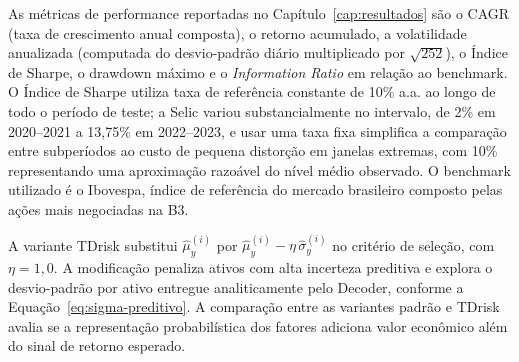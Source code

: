As métricas de performance reportadas no Capítulo~\ref{cap:resultados} são o CAGR
(taxa de crescimento anual composta), o retorno acumulado, a volatilidade anualizada
(computada do desvio-padrão diário multiplicado por $\sqrt{252}$), o Índice de Sharpe,
o drawdown máximo e o \textit{Information Ratio} em relação ao benchmark. O Índice de
Sharpe utiliza taxa de referência constante de 10\% a.a. ao longo de todo o período de
teste; a Selic variou substancialmente no intervalo, de 2\% em 2020--2021 a 13{,}75\%
em 2022--2023, e usar uma taxa fixa simplifica a comparação entre subperíodos ao custo
de pequena distorção em janelas extremas, com 10\% representando uma aproximação
razoável do nível médio observado. O benchmark utilizado é o Ibovespa, índice de
referência do mercado brasileiro composto pelas ações mais negociadas na B3.

A variante TDrisk substitui $\hat{\mu}_y^{(i)}$ por $\hat{\mu}_y^{(i)} - \eta\,
\hat{\sigma}_y^{(i)}$ no critério de seleção, com $\eta = 1{,}0$. A modificação
penaliza ativos com alta incerteza preditiva e explora o desvio-padrão por ativo
entregue analiticamente pelo Decoder, conforme a Equação~\ref{eq:sigma-preditivo}. A
comparação entre as variantes padrão e TDrisk avalia se a representação probabilística
dos fatores adiciona valor econômico além do sinal de retorno esperado.